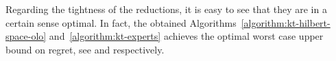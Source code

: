 

Regarding the tightness of the reductions, it is easy to see that they are in a
certain sense optimal. In fact, the obtained
Algorithms~\ref{algorithm:kt-hilbert-space-olo} and~\ref{algorithm:kt-experts}
achieves the optimal worst case upper bound on regret, see \cite{Streeter-McMahan-2012,Orabona-2013}
and \cite{Cesa-Bianchi-Lugosi-2006} respectively.

